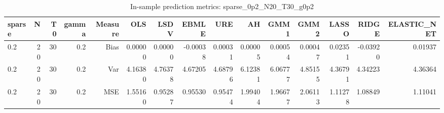 \begin{table}[!htbp]\centering
\caption{In-sample prediction metrics: sparse_0p2_N20_T30_g0p2}
\label{tab:table2_sparse_0p2_N20_T30_g0p2}
\begin{tabular}{lrrrrrrrrrrrrrr}
\hline
sparse & N & T0 & gamma & Measure & OLS & LSDV & EBMLE & URE & AH & GMM1 & GMM2 & LASSO & RIDGE & ELASTIC_NET \\
\hline
0.2 & 20 & 30 & 0.2 & Bias & 0.00000 & 0.00000 & -0.00038 & 0.00031 & 0.00005 & 0.00054 & 0.00047 & 0.02351 & -0.03920 & 0.01937 \\
0.2 & 20 & 30 & 0.2 & Var & 4.16380 & 4.76378 & 4.67205 & 4.68796 & 6.12381 & 6.06777 & 4.85155 & 4.36791 & 4.34223 & 4.36364 \\
0.2 & 20 & 30 & 0.2 & MSE & 1.55160 & 0.95287 & 0.95530 & 0.95474 & 1.99404 & 1.96677 & 2.06113 & 1.11278 & 1.08849 & 1.11041 \\
\hline
\end{tabular}
\end{table}

